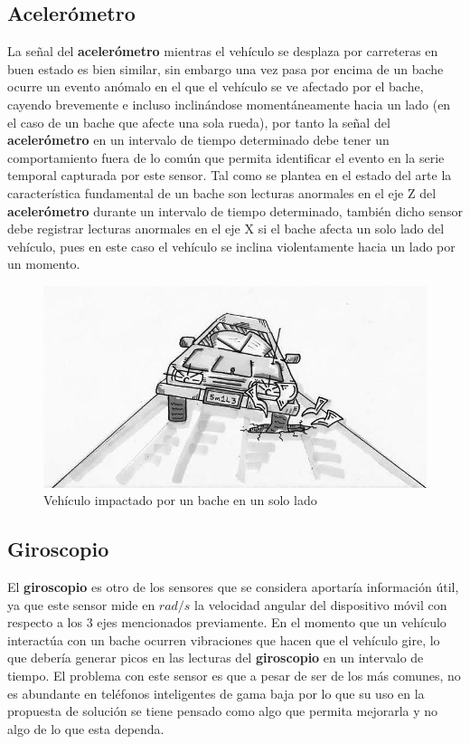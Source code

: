 	\subsection{Acelerómetro}
	La señal del \textbf{acelerómetro} mientras el vehículo se desplaza por carreteras en buen estado es bien similar,
	sin embargo una vez pasa por encima de un bache ocurre un evento anómalo en el que el vehículo se ve afectado
	por el bache, cayendo brevemente e incluso inclinándose momentáneamente hacia un lado (en el caso de un bache
	que afecte una sola rueda), por tanto la señal del \textbf{acelerómetro} en un intervalo de tiempo determinado debe tener
	un comportamiento fuera de lo común que permita identificar el evento en la serie temporal capturada por este sensor.
	Tal como se plantea en el estado del arte la característica fundamental de un bache son lecturas anormales en el eje
	Z del \textbf{acelerómetro} durante un intervalo de tiempo determinado, también dicho sensor debe registrar lecturas
	anormales en el eje X si el bache afecta un solo lado del vehículo, pues en este caso el vehículo se inclina violentamente
	hacia un lado por un momento.\\

	\begin{figure}[htb]
		\centering
		\includegraphics[scale = 0.5]{Graphics/one_side_pothole_vehicle.jpg}
		\caption{Vehículo impactado por un bache en un solo lado}
		\label{fig:2}
	\end{figure}

	\subsection{Giroscopio}
	El \textbf{giroscopio} es otro de los sensores que se considera aportaría información útil, ya que este sensor 
	mide en $rad/s$ la velocidad angular del dispositivo móvil con respecto a los 3 ejes mencionados previamente. 
	En el momento que un vehículo interactúa con un bache ocurren vibraciones que hacen que el vehículo gire, lo que
	debería generar picos en las lecturas del \textbf{giroscopio} en un intervalo de tiempo. El problema con este sensor es 
	que a pesar de ser de los más comunes, no es abundante en teléfonos inteligentes de gama baja por lo que 
	su uso en la propuesta de solución se tiene pensado como algo que permita mejorarla y no algo de lo que esta
	dependa.\\

